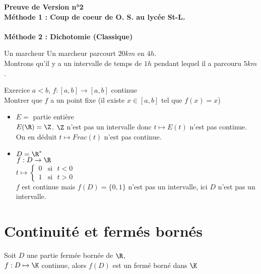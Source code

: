 \documentclass[12pt,a4paper]{report}
\begin{document}
\begin{demo}
\textbf{Preuve de Version n°2}\\
\textbf{Méthode 1 : Coup de coeur de O. S. au lycée St-L.}\\
\\
\textbf{Méthode 2 : Dichotomie (Classique)}\\
\end{demo}

\begin{application}{Un marcheur}{}
Un marcheur parcourt $20 km$ en $4h$.\\ 
Montrons qu'il y a un intervalle de temps de $1h$ pendant lequel il a parcouru $5 km$.\\
\end{application}

\begin{application}{Exercice}{}
$a<b$, $f:[a,b] \rightarrow [a,b]$ continue \\
Montrer que $f$ a un point fixe (\ie il existe $x\in [a,b]$ tel que $f(x) =x$)
\end{application}

\begin{remarque}[Remarques]
\begin{itemize}
    \item $E = $ partie entière \\
    $E(\R)=\Z$. $\Z$ n'est pas un intervalle donc $t \mapsto E(t)$ n'est pas continue.\\
    On en déduit $t \mapsto Frac(t)$ n'est pas continue. 
    \item $D=\R^*$\\
    $f:D \rightarrow \R$\\
    $t\mapsto \left\{\begin{array}{ll} 0 & \mbox{si} \mbox{ } t<0 \\ 1 & \mbox{si} \mbox{ } t>0
    \end{array}\right.$ \\
    $f$ est continue mais $f(D)= \lbrace 0,1 \rbrace$ n'est pas un intervalle, ici $D$ n'est pas un intervalle. 
\end{itemize}
\end{remarque}

\pagebreak
 
\section{Continuité et fermés bornés}
\begin{theoreme}{}{}
Soit $D$ une partie fermée bornée de $\R$, \\
$f:D \mapsto \K$ continue, alors $f(D)$ est un fermé borné dans $\K$
\end{theoreme}
\end{document}
